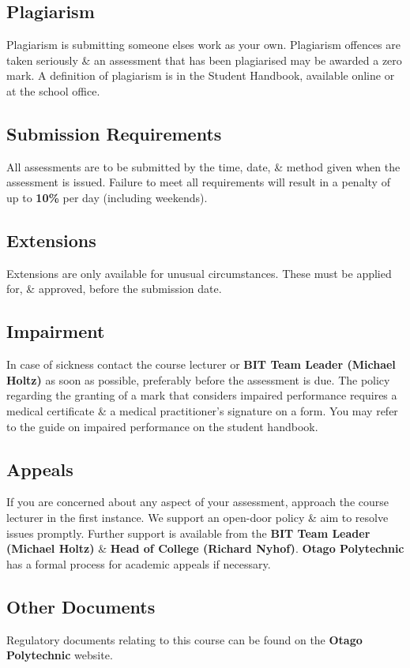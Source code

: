 \documentclass{article}
\begin{document}
\subsection*{Plagiarism}
Plagiarism is submitting someone elses work as your own. Plagiarism offences are taken seriously \& an assessment that has been plagiarised may be awarded a zero mark. A definition of plagiarism is in the Student Handbook, available online or at the school office.

\subsection*{Submission Requirements}
All assessments are to be submitted by the time, date, \& method given when the assessment is issued. Failure to meet all requirements will result in a penalty of up to \textbf{10\%} per day (including weekends).

\subsection*{Extensions}
Extensions are only available for unusual circumstances. These must be applied for, \& approved, before the submission date.

\subsection*{Impairment}
In case of sickness contact the course lecturer or \textbf{BIT Team Leader (Michael Holtz)} as soon as possible, preferably before the assessment is due. The policy regarding the granting of a mark that considers impaired performance requires a medical certificate \& a medical practitioner’s signature on a form. You may refer to the guide on impaired performance on the student handbook.

\subsection*{Appeals}
If you are concerned about any aspect of your assessment, approach the course lecturer in the first instance. We support an open-door policy \& aim to resolve issues promptly. Further support is available from the \textbf{BIT Team Leader (Michael Holtz)} \& \textbf{Head of College (Richard Nyhof)}. \textbf{Otago Polytechnic} has a formal process for academic appeals if necessary.

\subsection*{Other Documents}
Regulatory documents relating to this course can be found on the \textbf{Otago Polytechnic} website.
\end{document}
